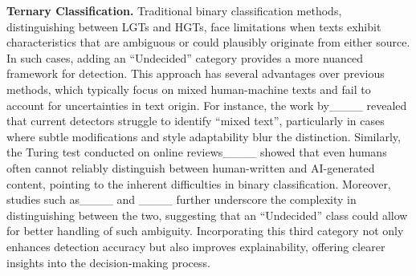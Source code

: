 \textbf{Ternary Classification.}
Traditional binary classification methods, distinguishing between LGTs and HGTs, face limitations when texts exhibit characteristics that are ambiguous or could plausibly originate from either source. In such cases, adding an ``Undecided'' category provides a more nuanced framework for detection. This approach has several advantages over previous methods, which typically focus on mixed human-machine texts and fail to account for uncertainties in text origin. For instance, the work by____ revealed that current detectors struggle to identify ``mixed text'', particularly in cases where subtle modifications and style adaptability blur the distinction. Similarly, the Turing test conducted on online reviews____ showed that even humans often cannot reliably distinguish between human-written and AI-generated content, pointing to the inherent difficulties in binary classification. Moreover, studies such as____ and ____ further underscore the complexity in distinguishing between the two, suggesting that an ``Undecided'' class could allow for better handling of such ambiguity. Incorporating this third category not only enhances detection accuracy but also improves explainability, offering clearer insights into the decision-making process.